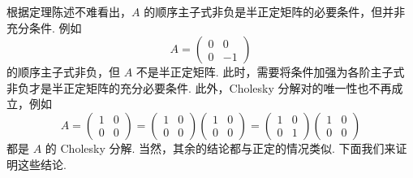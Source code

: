 根据定理陈述不难看出，$A$ 的顺序主子式非负是半正定矩阵的必要条件，但并非充分条件. 例如
\[A=\begin{pmatrix}
    0 & 0 \\
    0 & -1
\end{pmatrix}\]
的顺序主子式非负，但 $A$ 不是半正定矩阵. 此时，需要将条件加强为各阶主子式非负才是半正定矩阵的充分必要条件. 此外，Cholesky 分解对的唯一性也不再成立，例如
\[A=\begin{pmatrix}
    1 & 0 \\
    0 & 0
\end{pmatrix} = \begin{pmatrix}
    1 & 0 \\
    0 & 0
\end{pmatrix}\begin{pmatrix}
    1 & 0 \\
    0 & 0
\end{pmatrix} = \begin{pmatrix}
    1 & 0 \\
    0 & 1
\end{pmatrix}\begin{pmatrix}
    1 & 0 \\
    0 & 0
\end{pmatrix}\]
都是 $A$ 的 Cholesky 分解. 当然，其余的结论都与正定的情况类似. 下面我们来证明这些结论.

